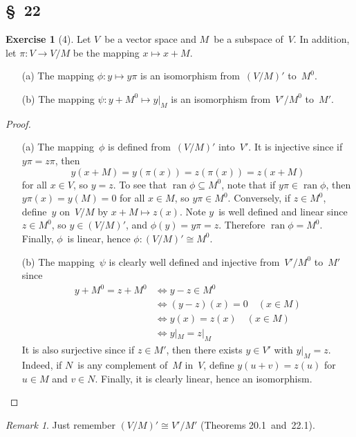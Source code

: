 \documentclass[letterpaper,12pt]{article}
\newcommand{\iso}{\cong}
\DeclareMathOperator{\ran}{ran}
\newcommand{\restrict}[2]{{#1}|_{#2}}
\theoremstyle{definition}
\newtheorem*{exer}{Exercise}
\theoremstyle{remark}
\newtheorem*{rmk}{Remark}
\theoremstyle{direction}
\begin{document}
\subsection*{\S~22}
\begin{exer}[4]
Let \(V\)~be a vector space and \(M\)~be a subspace of~\(V\). In addition, let \(\pi:V\to V/M\) be the mapping \(x\mapsto x+M\).
\begin{enumerate}
\item[(a)] The mapping \(\phi:y\mapsto y\pi\) is an isomorphism from~\((V/M)'\) to~\(M^0\).
\item[(b)] The mapping \(\psi:y+M^0\mapsto\restrict{y}{M}\) is an isomorphism from~\(V'/M^0\) to~\(M'\).
\end{enumerate}
\end{exer}
\begin{proof}\
\begin{enumerate}
\item[(a)] The mapping~\(\phi\) is defined from~\((V/M)'\) into~\(V'\). It is injective since if \(y\pi=z\pi\), then
\[y(x+M)=y(\pi(x))=z(\pi(x))=z(x+M)\]
for all \(x\in V\), so \(y=z\). To see that \(\ran\phi\subseteq M^0\), note that if \(y\pi\in\ran\phi\), then \(y\pi(x)=y(M)=0\) for all \(x\in M\), so \(y\pi\in M^0\). Conversely, if \(z\in M^0\), define~\(y\) on~\(V/M\) by \(x+M\mapsto z(x)\). Note \(y\)~is well defined and linear since \(z\in M^0\), so \(y\in(V/M)'\), and \(\phi(y)=y\pi=z\). Therefore \(\ran\phi=M^0\). Finally, \(\phi\)~is linear, hence \(\phi:(V/M)'\iso M^0\).
\item[(b)] The mapping~\(\psi\) is clearly well defined and injective from~\(V'/M^0\) to~\(M'\) since
\begin{align*}
y+M^0=z+M^0&\iff y-z\in M^0\\
	&\iff (y-z)(x)=0\quad(x\in M)\\
	&\iff y(x)=z(x)\quad(x\in M)\\
	&\iff\restrict{y}{M}=\restrict{z}{M}
\end{align*}
It is also surjective since if \(z\in M'\), then there exists \(y\in V'\) with \(\restrict{y}{M}=z\). Indeed, if \(N\)~is any complement of~\(M\) in~\(V\), define \(y(u+v)=z(u)\) for \(u\in M\) and \(v\in N\). Finally, it is clearly linear, hence an isomorphism.\qedhere
\end{enumerate}
\end{proof}
\begin{rmk}
Just remember \((V/M)'\iso V'/M'\) (Theorems 20.1~and~22.1).
\end{rmk}
\end{document}
